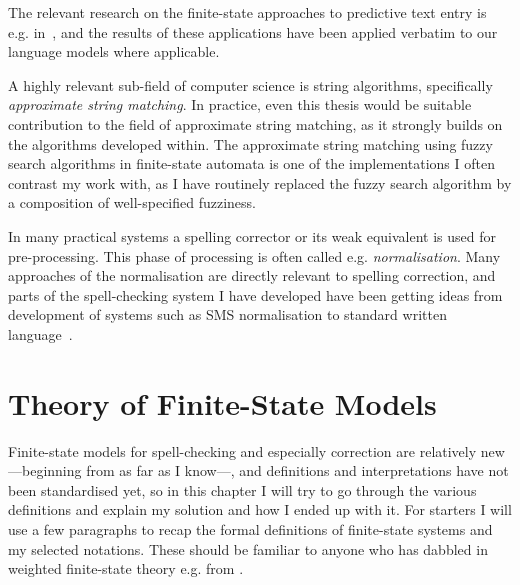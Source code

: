 \documentclass[officiallayout]{unihelcompling}
\begin{document}
The relevant research on the finite-state approaches to predictive text entry
is e.g. in~\citep{silfverberg2010partofspeech}, and the results of
these applications have been applied verbatim to our language models where
applicable.

A highly relevant sub-field of computer science is string algorithms,
specifically \emph{approximate string matching}. In practice, even this
thesis would be suitable contribution to the field of approximate string
matching, as it strongly builds on the algorithms developed within. The
approximate string matching using fuzzy search algorithms in finite-state
automata is one of the implementations I often contrast my work with, as
I have routinely replaced the fuzzy search algorithm by a composition of
well-specified fuzziness.

In many practical systems a spelling corrector or its weak equivalent is used
for pre-processing. This phase of processing is often called e.g. 
\emph{normalisation}. Many approaches of the normalisation are directly
relevant to spelling correction, and parts of the spell-checking system I have
developed have been getting ideas from development of systems such as SMS
normalisation to standard written language~\citep{kobus2008normalizing}.

\section{Theory of Finite-State Models}
\label{sec:finite-state-theory}

Finite-state models for spell-checking and especially correction are relatively
new---beginning from \citep{oflazer1996errortolerant} as far as I know---, and
definitions and interpretations have not been standardised yet, so in this
chapter I will try to go through the various definitions and explain my
solution and how I ended up with it. For starters I will use a few paragraphs
to recap the formal definitions of finite-state systems and my selected
notations. These should be familiar to anyone who has dabbled in weighted
finite-state theory e.g. from \citet{aho2007compilers,mohri1997finitestate}.
\end{document}
